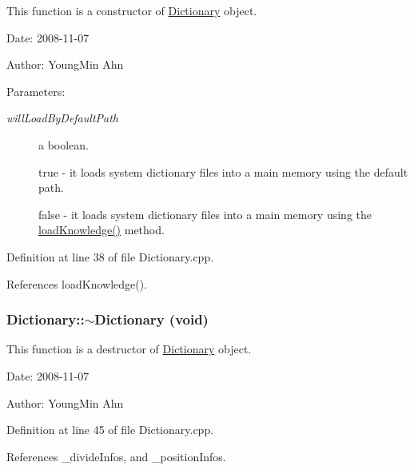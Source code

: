 This function is a constructor of \hyperlink{classkmaOrange_1_1Dictionary}{Dictionary} object. 

\begin{Desc}
\item[Date:]2008-11-07 \end{Desc}
\begin{Desc}
\item[Author:]YoungMin Ahn \end{Desc}
\begin{Desc}
\item[Parameters:]
\begin{description}
\item[{\em willLoadByDefaultPath}]a boolean. \par
 true - it loads system dictionary files into a main memory using the default path. \par
 false - it loads system dictionary files into a main memory using the \hyperlink{classkmaOrange_1_1Dictionary_22a1dd6af0f8698ff758de165ba5b613}{loadKnowledge()} method. \end{description}
\end{Desc}


Definition at line 38 of file Dictionary.cpp.

References loadKnowledge().\hypertarget{classkmaOrange_1_1Dictionary_11930f473ace7cb8a0f38997a2b09dcb}{
\subsubsection[{$\sim$Dictionary}]{\setlength{\rightskip}{0pt plus 5cm}Dictionary::$\sim$Dictionary (void)}}
\label{classkmaOrange_1_1Dictionary_11930f473ace7cb8a0f38997a2b09dcb}


This function is a destructor of \hyperlink{classkmaOrange_1_1Dictionary}{Dictionary} object. 

\begin{Desc}
\item[Date:]2008-11-07 \end{Desc}
\begin{Desc}
\item[Author:]YoungMin Ahn \end{Desc}


Definition at line 45 of file Dictionary.cpp.

References \_\-divideInfos, and \_\-positionInfos.

